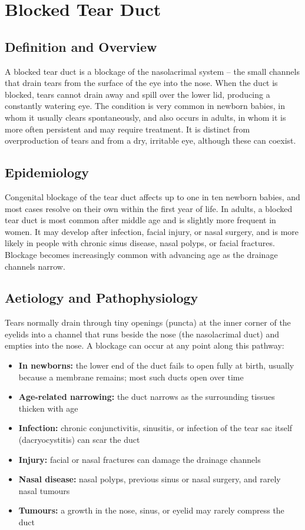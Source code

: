 \chapter{Blocked Tear Duct}

\section*{Definition and Overview}
A blocked tear duct is a blockage of the nasolacrimal system -- the small channels that drain tears from the surface of the eye into the nose. When the duct is blocked, tears cannot drain away and spill over the lower lid, producing a constantly watering eye. The condition is very common in newborn babies, in whom it usually clears spontaneously, and also occurs in adults, in whom it is more often persistent and may require treatment. It is distinct from overproduction of tears and from a dry, irritable eye, although these can coexist.

\section*{Epidemiology}
Congenital blockage of the tear duct affects up to one in ten newborn babies, and most cases resolve on their own within the first year of life. In adults, a blocked tear duct is most common after middle age and is slightly more frequent in women. It may develop after infection, facial injury, or nasal surgery, and is more likely in people with chronic sinus disease, nasal polyps, or facial fractures. Blockage becomes increasingly common with advancing age as the drainage channels narrow.

\section*{Aetiology and Pathophysiology}
Tears normally drain through tiny openings (puncta) at the inner corner of the eyelids into a channel that runs beside the nose (the nasolacrimal duct) and empties into the nose. A blockage can occur at any point along this pathway:

\begin{itemize}
    \item \textbf{In newborns:} the lower end of the duct fails to open fully at birth, usually because a membrane remains; most such ducts open over time
    \item \textbf{Age-related narrowing:} the duct narrows as the surrounding tissues thicken with age
    \item \textbf{Infection:} chronic conjunctivitis, sinusitis, or infection of the tear sac itself (dacryocystitis) can scar the duct
    \item \textbf{Injury:} facial or nasal fractures can damage the drainage channels
    \item \textbf{Nasal disease:} nasal polyps, previous sinus or nasal surgery, and rarely nasal tumours
    \item \textbf{Tumours:} a growth in the nose, sinus, or eyelid may rarely compress the duct
\end{itemize}

